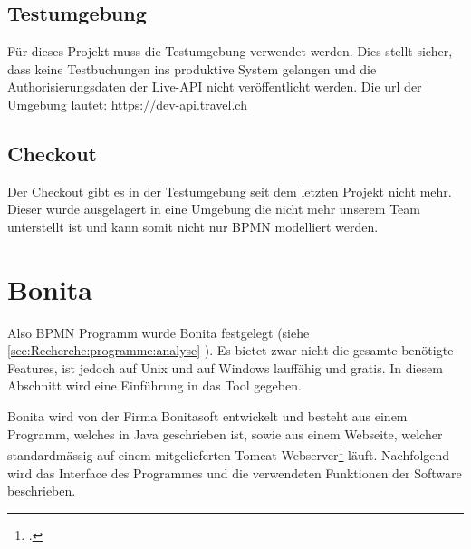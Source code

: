 \subsection{Testumgebung}
Für dieses Projekt muss die Testumgebung verwendet werden. Dies stellt sicher, dass keine Testbuchungen ins produktive System gelangen und die Authorisierungsdaten der Live-API nicht veröffentlicht werden.
Die \gls{url} der Umgebung lautet: https://dev-api.travel.ch

\subsection{Checkout}
Der Checkout gibt es in der Testumgebung seit dem letzten Projekt nicht mehr. Dieser wurde ausgelagert in eine Umgebung die nicht mehr unserem Team unterstellt ist und kann somit nicht nur BPMN modelliert werden.

\section{Bonita}
Also BPMN Programm wurde Bonita festgelegt (siehe \cref{sec:Recherche:programme:analyse} ). Es bietet zwar nicht die gesamte benötigte Features, ist jedoch auf Unix und auf Windows lauffähig und gratis. In diesem Abschnitt wird eine Einführung in das Tool gegeben. 

Bonita wird von der Firma Bonitasoft entwickelt und besteht aus einem Programm, welches in Java geschrieben ist, sowie aus einem Webseite, welcher standardmässig auf einem mitgelieferten Tomcat Webserver\footcite{Tomcat_2016-06-12} läuft.
Nachfolgend wird das Interface des Programmes und die verwendeten Funktionen der Software beschrieben.

